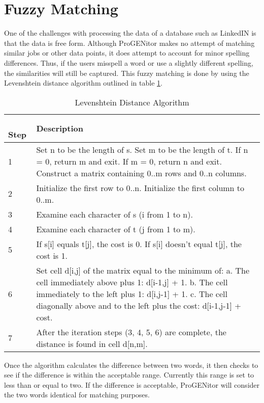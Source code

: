 \section{Fuzzy Matching}
\label{sect:fuzzy-matching}
One of the challenges with processing the data of a database such as LinkedIN is
that the data is free form.  Although ProGENitor makes no attempt of matching
similar jobs or other data points, it does attempt to account for minor spelling
differences.  Thus, if the users misspell a word or use a slightly different
spelling, the similarities will still be captured. This fuzzy matching is
done by using the Levenshtein distance algorithm\cite{fuzzy} outlined in table
\ref{tab:lev-dist}.  

\begin{table}[H]
  \centering
  \begin{tabular}{|p{.5in}|p{4in}|}
  \hline
  \
  Step & Description \\
  \hline\hline
  1 &  Set n to be the length of s.\newline 
  Set m to be the length of t.\newline
  If n = 0, return m and exit.\newline
  If m = 0, return n and exit.\newline
  Construct a matrix containing 0..m rows and 0..n columns.  \\ \hline 
  2 &  	Initialize the first row to 0..n.\newline
  Initialize the first column to 0..m.\\ \hline 
  3 & Examine each character of s (i from 1 to n). \\ \hline
  4 & Examine each character of t (j from 1 to m). \\ \hline
  5 &  	If s[i] equals t[j], the cost is 0.\newline
  If s[i] doesn't equal t[j], the cost is 1. \\\hline 
  6 &  	Set cell d[i,j] of the matrix equal to the minimum of:\newline
  a. The cell immediately above plus 1: d[i-1,j] + 1.\newline
  b. The cell immediately to the left plus 1: d[i,j-1] + 1.\newline
  c. The cell diagonally above and to the left plus the cost: d[i-1,j-1] + cost.\\ \hline
  7 & After the iteration steps (3, 4, 5, 6) are complete, the distance is found in cell d[n,m]. \\ \hline
  \end{tabular}
  \label{tab:lev-dist}
  \caption{Levenshtein Distance Algorithm}
\end{table}

Once the algorithm calculates the difference between two
words, it then checks to see if the difference is within the acceptable range. 
Currently this range is set to less than or equal to two.  If the difference is
acceptable, ProGENitor will consider the two words identical for matching
purposes.


